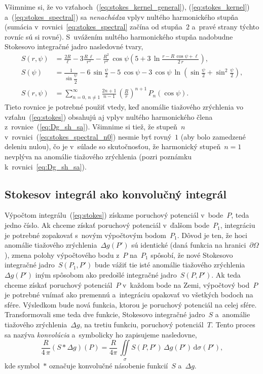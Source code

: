 \documentclass[a4paper, 12pt]{book}
\newcommand{\diff}{\mathrm d}
\begin{document}
Všimnime si, že vo vzťahoch~(\ref{eq:stokes_kernel_general}), 
(\ref{eq:stokes_kernel}) a~(\ref{eq:stokes_spectral}) sa \emph{nenachádza} 
vplyv nultého harmonického stupňa (sumácia v~rovnici~\ref{eq:stokes_spectral} 
začína od stupňa~$2$ a~pravé strany týchto rovníc sú si rovné).  S~uvážením 
nultého harmonického stupňa nadobudne Stokesovo integračné jadro nasledovné 
tvary,
%
\begin{align}
S(r, \psi) &= \frac{2R}{\ell} - 3\frac{R \, \ell}{r^2} - \frac{R^2}{r^2} \, 
\cos\psi\left( 5 + 3 \, \ln \frac{r - R \, \cos\psi + \ell}{2 \, r} \right){,}
\label{eq:stokes_kernel_general_n0}
\\
%
S(\psi) &= \frac{1}{\sin\dfrac{\psi}{2}} - 6 \, \sin\frac{\psi}{2} - 5 \, 
\cos\psi - 3 \, \cos\psi \, \ln\left( \sin\frac{\psi}{2} + \sin^2\frac{\psi}{2} 
\right){,}
\label{eq:stokes_kernel_n0}
\\
%
S(r, \psi) &= \sum_{n = 0{,}\, n \neq 1}^{\infty} \frac{2n + 1}{n - 1} \, 
\left( \frac{R}{r} \right)^{n + 1} \, P_n(\cos\psi){.}
\label{eq:stokes_spectral_n0}
\end{align}
%
Tieto rovnice je potrebné použiť vtedy, keď anomálie tiažového zrýchlenia vo 
vzťahu~(\ref{eq:stokes}) obsahujú aj vplyv nultého harmonického člena 
z~rovnice~(\ref{eq:Dg_sh_sa}).  Všimnime si tiež, že stupeň~$n$ 
v~rovnici~(\ref{eq:stokes_spectral_n0}) nesmie byť rovný~$1$ (aby bolo 
zamedzené deleniu nulou), čo je v~súlade so skutočnosťou, že harmonický 
stupeň~$n = 1$ nevplýva na anomálie tiažového zrýchlenia (pozri poznámku 
k~rovnici~\ref{eq:Dg_sh_sa}).


\subsection{Stokesov integrál ako konvolučný integrál}
\label{sec:stokes_convolution}

Výpočtom integrálu~(\ref{eq:stokes}) získame poruchový potenciál v~bode~$P$, 
teda jedno číslo.  Ak chceme získať poruchový potenciál v~ďalšom bode~$P_1$, 
integráciu je potrebné zopakovať s~novým výpočtovým bodom~$P_1$.  Dôvod je ten, 
že hoci anomálie tiažového zrýchlenia~$\Delta g(P')$ sú identické (daná funkcia 
na hranici~$\partial\Omega$), zmena polohy výpočtového bodu z~$P$ na~$P_1$ 
spôsobí, že nové Stokesovo integračné jadro~$S(P_1, P')$ bude vážiť tie isté 
anomálie tiažového zrýchlenia~$\Delta g(P')$ iným spôsobom ako predošlé 
integračné jadro~$S(P, P')$.  Ak teda chceme získať poruchový potenciál~$P$ 
v~každom bode na Zemi, výpočtový bod~$P$ je potrebné vnímať ako premennú 
a~integráciu opakovať vo všetkých bodoch na sfére.  Výsledkom bude nová 
funkcia, ktorou je poruchový potenciál na celej sfére.  Transformovali sme teda 
dve funkcie, Stokesovo integračné jadro~$S$ a~anomálie tiažového 
zrýchlenia~$\Delta g$, na tretiu funkciu, poruchový potenciál~$T$.  Tento 
proces sa nazýva \emph{konvolúcia} a~symbolicky ho zapisujeme nasledovne,
%
\begin{equation}
\label{eq:stokes_convolution}
\frac{R}{4 \, \pi}(S * \Delta g)(P) = \frac{R}{4\pi} \, \iint\limits_\sigma 
S(P, P') \, \Delta g(P') \, \diff\sigma(P'){,}
\end{equation}
%
kde symbol~$*$ označuje konvolučné násobenie funkcií~$S$ a~$\Delta g$.
\end{document}
